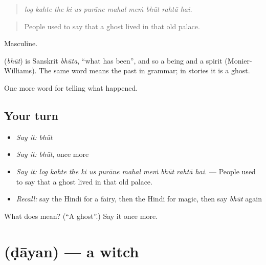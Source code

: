 \begin{quote}
          
\end{quote}

\begin{quote}
\emph{log kahte the ki us purāne mahal meṁ bhūt rahtā hai.}
\end{quote}

\begin{quote}
People used to say that a ghost lived in that old palace.
\end{quote}

Masculine.

\begin{cousinweb}
\textbf{} (\emph{bhūt}) is Sanskrit \emph{bhūta}, \textquotedblleft{}what has been\textquotedblright{}, and so a being and a spirit (Monier-Williams). The same word means the past in grammar; in stories it is a ghost.
\end{cousinweb}

\begin{grammarlens}[title={What you've built}]
One more word for telling what happened.
\end{grammarlens}

\subsection*{Your turn}
\begin{itemize}
\raggedright
  \item \emph{Say it:} \emph{bhūt}
  \item \emph{Say it:} \emph{bhūt}, once more
  \item \emph{Say it:} \emph{log kahte the ki us purāne mahal meṁ bhūt rahtā hai.} — People used to say that a ghost lived in that old palace.
  \item \emph{Recall:} say the Hindi for a fairy, then the Hindi for magic, then say \emph{bhūt} again
\end{itemize}

\begin{tcolorbox}[breakable,colback=teal!4,colframe=teal!35!black,title={Before you move on}]
What does  mean? (\textquotedblleft{}A ghost\textquotedblright{}.) Say it once more.
\end{tcolorbox}
\section[\texorpdfstring{\hi{डायन} (ḍāyan)}{डायन (ḍāyan)}]{ (ḍāyan) — a witch}

